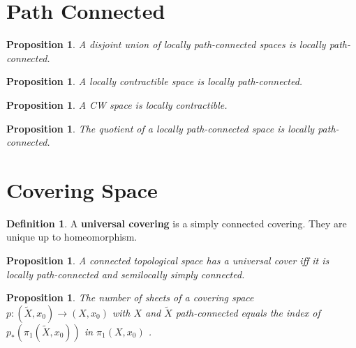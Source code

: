 \documentclass[a4paper]{article}
\theoremstyle{theorem}
\newtheorem{proposition}[theorem]{Proposition}
\theoremstyle{definition}
\newtheorem{definition}{Definition} [section]
\theoremstyle{remark}
\theoremstyle{gremark}
\theoremstyle{discussion}
\theoremstyle{notation}
\begin{document}
	
\section*{Path Connected}

\begin{proposition}
	A disjoint union of locally path-connected spaces is locally path-connected.
\end{proposition}

\begin{proposition}
	A locally contractible space is locally path-connected.
\end{proposition}

\begin{proposition}
	A CW space is locally contractible.
\end{proposition}

\begin{proposition}
	The quotient of a locally path-connected space is locally path-connected.
\end{proposition}

\section{Covering Space}

\begin{definition}
	A \textbf{universal covering} is a simply connected covering. They are unique up to homeomorphism.
\end{definition}

\begin{proposition}
	A connected topological space has a universal cover iff it is locally path-connected and semilocally simply connected.
\end{proposition}

\begin{proposition}
	The number of sheets of a covering space $p : ( \widetilde{X}, x_0)\to (X, x_0)$
	with $X$ and $\widetilde{X}$ path-connected equals the index of $p_*(\pi_1(\widetilde{X}, x_0))$ in $\pi_1(X, x_0)$ .
\end{proposition}
\end{document}
